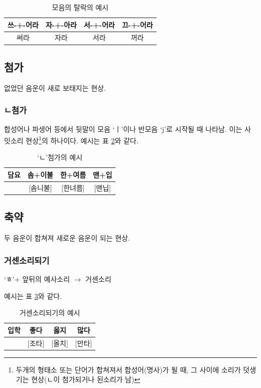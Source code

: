 \documentclass[10pt]{report}
\newcommand{\tl}{\textquoteleft}
\newcommand{\tr}{\textquoteright}
\begin{document}
\begin{table}
\begin{center}
	\begin{tabular}{|c|c|c|c|}
		\hline
		쓰-+-어라 & 자-+-아라 & 서-+-어라 & 끄-+-어라 \\
		\hline
		써라 & 자라 & 서라 & 꺼라 \\
		\hline
	\end{tabular}
	\caption{모음의 탈락의 예시}
	\label{vowel_omission}
\end{center}
\end{table}

\subsection{첨가}
없었던 음운이 새로 보태지는 현상.
\subsubsection{ㄴ첨가}
합성어나 파생어 등에서 뒷말이 모음 \tl ㅣ\tr 이나 반모음 \tl j\tr 로 시작될 때 나타남. 이는 사잇소리 현상\footnote{두개의 형태소 또는 단어가 합쳐져서 합성어(명사)가 될 때, 그 사이에 소리가 덧생기는 현상(ㄴ이 첨가되거나 된소리가 남)}의 하나이다. 예시는 표 \ref{sickle_addition}와 같다.

\begin{table}
\begin{center}
	\begin{tabular}{|c|c|c|c|}
		\hline
		담요 & 솜+이불 & 한+여름 & 맨+입\\
		\hline
		[담뇨] & [솜니불] & [한녀름] & [맨닙]\\
		\hline
	\end{tabular}
	\caption{\tl ㄴ\tr 첨가의 예시}
	\label{sickle_addition}
\end{center}
\end{table}

\subsection{축약}
두 음운이 합쳐져 새로운 음운이 되는 현상.
\subsubsection{거센소리되기}
\tl ㅎ\tr + 앞뒤의 예사소리 $\rightarrow$ 거센소리

예시는 표 \ref{aspirated}와 같다.
\begin{table}
\begin{center}
	\begin{tabular}{|c|c|c|c|}
		\hline
		입학 & 좋다 & 옳지 & 많다 \\
		\hline
		[이팍] & [조타] & [올치] & [만타] \\ 
		\hline
	\end{tabular}
	\caption{거센소리되기의 예시}
	\label{aspirated}
\end{center}
\end{table}
\end{document}

